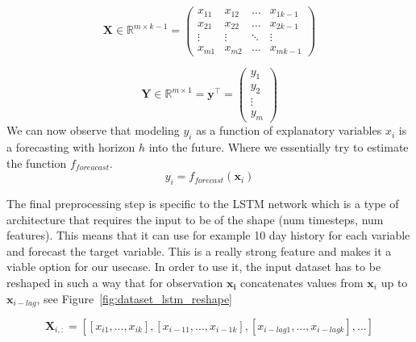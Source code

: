 \begin{equation}\label{eq:explanatory}
    \mathbf{X} \in \mathbb{R}^{m \times {k-1}} = 
    \begin{pmatrix}
        x_{11} & x_{12} & \dots  & x_{1k-1} \\
        x_{21} & x_{22} & \dots  & x_{2k-1} \\
        \vdots & \vdots & \ddots & \vdots \\
        x_{m1} & x_{m2} & \dots  & x_{mk-1}
    \end{pmatrix}
\end{equation}

\begin{equation}\label{eq:target}
    \mathbf{Y} \in \mathbb{R}^{m \times 1} = \mathbf{y^\top} = 
\begin{pmatrix}
    y_{1}\\
    y_{2}\\
    \vdots  \\
    y_{m} 
\end{pmatrix}
\end{equation}
We can now observe that modeling $y_i$ as a function of
explanatory variables $x_{i}$ is a forecasting with horizon $h$ into the future.
Where we essentially try to estimate the function $f_{foreacast}$.
\begin{equation}\label{eq:model_simple}
    y_i = f_{forecast}(\mathbf{x}_{i})
\end{equation}

The final preprocessing step is specific to the \ac{LSTM} network which is
a type of architecture that requires the input to be of 
the shape (num timesteps, num features).
This means that it can use for example 10 day history for each variable
and forecast the target variable. This is a really strong feature and 
makes it a viable option for our usecase. In order to use it, the input dataset
has to be reshaped in such a way that for observation $\mathbf{x_{i}}$ 
concatenates values from $\mathbf{x}_{i}$ 
up to $\mathbf{x}_{i-lag}$, see Figure~\ref{fig:dataset_lstm_reshape}


\begin{equation}\label{eq:lstm_reshape}
    \mathbf{X}_{i,:} = [[{x}_{i1},...,{x}_{ik}],
    [{x}_{i-11},...,{x}_{i-1k}],
    [{x}_{i-lag1},...,{x}_{i-lagk}],...]
\end{equation}

